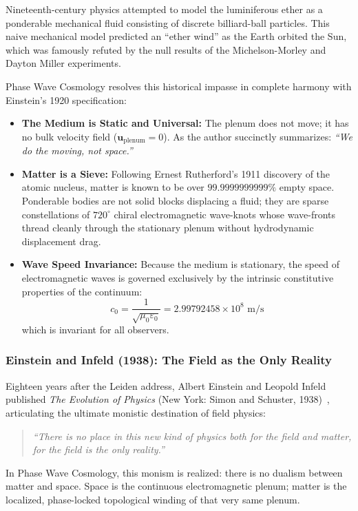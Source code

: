 \documentclass[11pt,a4paper]{article}
\begin{document}
Nineteenth-century physics attempted to model the luminiferous ether as a ponderable mechanical fluid consisting of discrete billiard-ball particles. This naive mechanical model predicted an ``ether wind'' as the Earth orbited the Sun, which was famously refuted by the null results of the Michelson-Morley and Dayton Miller experiments.

Phase Wave Cosmology resolves this historical impasse in complete harmony with Einstein's 1920 specification:
\begin{itemize}
    \item \textbf{The Medium is Static and Universal:} The plenum does not move; it has no bulk velocity field ($\mathbf{u}_{\text{plenum}} = 0$). As the author succinctly summarizes: \textit{``We do the moving, not space.''}
    \item \textbf{Matter is a Sieve:} Following Ernest Rutherford's 1911 discovery of the atomic nucleus, matter is known to be over $99.9999999999\%$ empty space. Ponderable bodies are not solid blocks displacing a fluid; they are sparse constellations of $720^\circ$ chiral electromagnetic wave-knots whose wave-fronts thread cleanly through the stationary plenum without hydrodynamic displacement drag.
    \item \textbf{Wave Speed Invariance:} Because the medium is stationary, the speed of electromagnetic waves is governed exclusively by the intrinsic constitutive properties of the continuum:
    \begin{equation}
    c_0 = \frac{1}{\sqrt{\mu_0\varepsilon_0}} = 2.99792458 \times 10^8\text{ m/s}
    \end{equation}
    which is invariant for all observers.
\end{itemize}

\subsubsection{Einstein and Infeld (1938): The Field as the Only Reality}

Eighteen years after the Leiden address, Albert Einstein and Leopold Infeld published \textit{The Evolution of Physics} (New York: Simon and Schuster, 1938)~\cite{EinsteinInfeld1938}, articulating the ultimate monistic destination of field physics:
\begin{quote}
\textit{``There is no place in this new kind of physics both for the field and matter, for the field is the only reality.''}
\end{quote}
In Phase Wave Cosmology, this monism is realized: there is no dualism between matter and space. Space is the continuous electromagnetic plenum; matter is the localized, phase-locked topological winding of that very same plenum.
\end{document}
